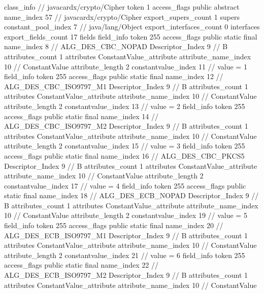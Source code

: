 {{{		}
		class_info {		// javacardx/crypto/Cipher
			token	1
			access_flags	public abstract
			name_index	57		// javacardx/crypto/Cipher
			export_supers_count	1
			supers {
				constant_pool_index	7		// java/lang/Object
			}
			export_interfaces_count	0
			interfaces {
			}
			export_fields_count	17
			fields {
			field_info {
				token	255
				access_flags	public static final
				name_index	8		// ALG_DES_CBC_NOPAD
				Descriptor_Index	9		// B
				attributes_count	1
				attributes {
				ConstantValue_attribute {
					attribute_name_index	10		// ConstantValue
					attribute_length	2
					constantvalue_index	11		// value = 1
				}
				}
			}
			field_info {
				token	255
				access_flags	public static final
				name_index	12		// ALG_DES_CBC_ISO9797_M1
				Descriptor_Index	9		// B
				attributes_count	1
				attributes {
				ConstantValue_attribute {
					attribute_name_index	10		// ConstantValue
					attribute_length	2
					constantvalue_index	13		// value = 2
				}
				}
			}
			field_info {
				token	255
				access_flags	public static final
				name_index	14		// ALG_DES_CBC_ISO9797_M2
				Descriptor_Index	9		// B
				attributes_count	1
				attributes {
				ConstantValue_attribute {
					attribute_name_index	10		// ConstantValue
					attribute_length	2
					constantvalue_index	15		// value = 3
				}
				}
			}
			field_info {
				token	255
				access_flags	public static final
				name_index	16		// ALG_DES_CBC_PKCS5
				Descriptor_Index	9		// B
				attributes_count	1
				attributes {
				ConstantValue_attribute {
					attribute_name_index	10		// ConstantValue
					attribute_length	2
					constantvalue_index	17		// value = 4
				}
				}
			}
			field_info {
				token	255
				access_flags	public static final
				name_index	18		// ALG_DES_ECB_NOPAD
				Descriptor_Index	9		// B
				attributes_count	1
				attributes {
				ConstantValue_attribute {
					attribute_name_index	10		// ConstantValue
					attribute_length	2
					constantvalue_index	19		// value = 5
				}
				}
			}
			field_info {
				token	255
				access_flags	public static final
				name_index	20		// ALG_DES_ECB_ISO9797_M1
				Descriptor_Index	9		// B
				attributes_count	1
				attributes {
				ConstantValue_attribute {
					attribute_name_index	10		// ConstantValue
					attribute_length	2
					constantvalue_index	21		// value = 6
				}
				}
			}
			field_info {
				token	255
				access_flags	public static final
				name_index	22		// ALG_DES_ECB_ISO9797_M2
				Descriptor_Index	9		// B
				attributes_count	1
				attributes {
				ConstantValue_attribute {
					attribute_name_index	10		// ConstantValue
}}}}}}}
